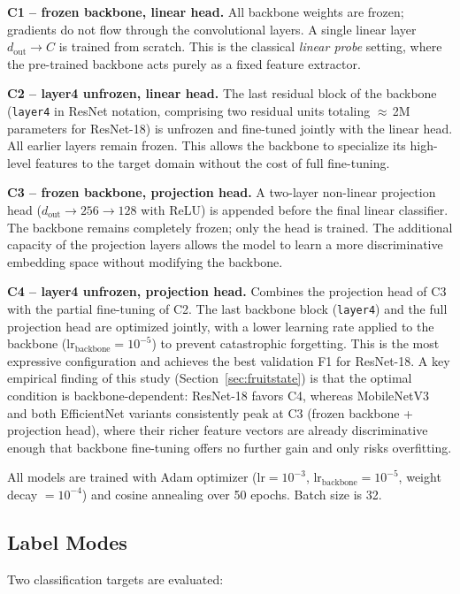 \documentclass[12pt, a4paper]{article}
\begin{document}
\textbf{C1 -- frozen backbone, linear head.}
All backbone weights are frozen; gradients do not flow through the convolutional
layers.
A single linear layer $d_\text{out} \to C$ is trained from scratch.
This is the classical \emph{linear probe} setting, where the pre-trained backbone
acts purely as a fixed feature extractor.

\textbf{C2 -- layer4 unfrozen, linear head.}
The last residual block of the backbone (\texttt{layer4} in ResNet notation,
comprising two residual units totaling $\approx$\,2M parameters for ResNet-18)
is unfrozen and fine-tuned jointly with the linear head.
All earlier layers remain frozen.
This allows the backbone to specialize its high-level features to the target
domain without the cost of full fine-tuning.

\textbf{C3 -- frozen backbone, projection head.}
A two-layer non-linear projection head
($d_\text{out} \!\to\! 256 \!\to\! 128$ with ReLU) is appended before the
final linear classifier.
The backbone remains completely frozen; only the head is trained.
The additional capacity of the projection layers allows the model to learn a
more discriminative embedding space without modifying the backbone.

\textbf{C4 -- layer4 unfrozen, projection head.}
Combines the projection head of C3 with the partial fine-tuning of C2.
The last backbone block (\texttt{layer4}) and the full projection head are
optimized jointly, with a lower learning rate applied to the backbone
($\text{lr}_\text{backbone} = 10^{-5}$) to prevent catastrophic forgetting.
This is the most expressive configuration and achieves the best validation F1
for ResNet-18.
A key empirical finding of this study (Section~\ref{sec:fruitstate}) is that the
optimal condition is backbone-dependent: ResNet-18 favors C4, whereas
MobileNetV3 and both EfficientNet variants consistently peak at C3
(frozen backbone + projection head), where their richer feature vectors are
already discriminative enough that backbone fine-tuning offers no further gain
and only risks overfitting.

All models are trained with Adam optimizer
($\text{lr} = 10^{-3}$, $\text{lr}_\text{backbone} = 10^{-5}$,
weight decay $= 10^{-4}$) and cosine annealing over 50 epochs.
Batch size is 32.

\subsection{Label Modes}

Two classification targets are evaluated:
\end{document}
